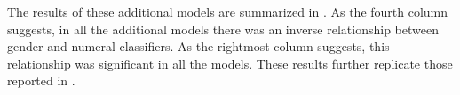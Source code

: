 \documentclass[output=collectionpaper]{langsci/langscibook}
\begin{document}
The results of these additional models are summarized in . As the fourth column suggests, in all the additional models there was an inverse relationship between gender and numeral classifiers. As the rightmost column suggests, this relationship was significant in all the models. These results further replicate those reported in .



{\sloppy\printbibliography[heading=subbibliography,notkeyword=this]}
\end{document}
